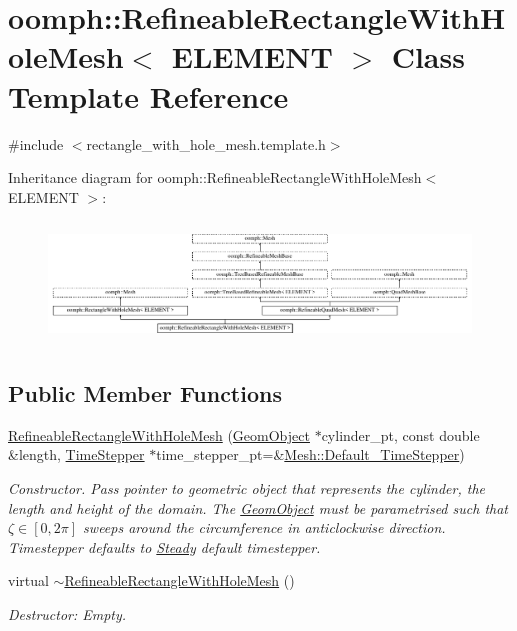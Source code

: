 \hypertarget{classoomph_1_1RefineableRectangleWithHoleMesh}{}\section{oomph\+:\+:Refineable\+Rectangle\+With\+Hole\+Mesh$<$ E\+L\+E\+M\+E\+NT $>$ Class Template Reference}
\label{classoomph_1_1RefineableRectangleWithHoleMesh}


{\ttfamily \#include $<$rectangle\+\_\+with\+\_\+hole\+\_\+mesh.\+template.\+h$>$}

Inheritance diagram for oomph\+:\+:Refineable\+Rectangle\+With\+Hole\+Mesh$<$ E\+L\+E\+M\+E\+NT $>$\+:\begin{figure}[H]
\begin{center}
\leavevmode
\includegraphics[height=3.274854cm]{classoomph_1_1RefineableRectangleWithHoleMesh}
\end{center}
\end{figure}
\subsection*{Public Member Functions}
\begin{DoxyCompactItemize}
\item 
\hyperlink{classoomph_1_1RefineableRectangleWithHoleMesh_a1b403fb6e31836c816e9a9cdfaa7703b}{Refineable\+Rectangle\+With\+Hole\+Mesh} (\hyperlink{classoomph_1_1GeomObject}{Geom\+Object} $\ast$cylinder\+\_\+pt, const double \&length, \hyperlink{classoomph_1_1TimeStepper}{Time\+Stepper} $\ast$time\+\_\+stepper\+\_\+pt=\&\hyperlink{classoomph_1_1Mesh_a12243d0fee2b1fcee729ee5a4777ea10}{Mesh\+::\+Default\+\_\+\+Time\+Stepper})
\begin{DoxyCompactList}\small\item\em Constructor. Pass pointer to geometric object that represents the cylinder, the length and height of the domain. The \hyperlink{classoomph_1_1GeomObject}{Geom\+Object} must be parametrised such that $\zeta \in [0,2\pi]$ sweeps around the circumference in anticlockwise direction. Timestepper defaults to \hyperlink{classoomph_1_1Steady}{Steady} default timestepper. \end{DoxyCompactList}\item 
virtual \hyperlink{classoomph_1_1RefineableRectangleWithHoleMesh_a1a04b6a5da21108a50934c4909625cf1}{$\sim$\+Refineable\+Rectangle\+With\+Hole\+Mesh} ()
\begin{DoxyCompactList}\small\item\em Destructor\+: Empty. \end{DoxyCompactList}\end{DoxyCompactItemize}
